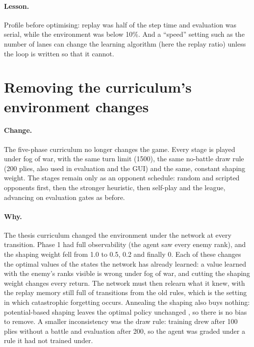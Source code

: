 \paragraph{Lesson.} Profile before optimising: replay was half of the step time and evaluation
was serial, while the environment was below 10\%. And a ``speed'' setting such as the number of
lanes can change the learning algorithm (here the replay ratio) unless the loop is written so
that it cannot.

\section{Removing the curriculum's environment changes}

\paragraph{Change.} The five-phase curriculum no longer changes the game. Every stage is played
under fog of war, with the same turn limit (1500), the same no-battle draw rule (200 plies,
also used in evaluation and the GUI) and the same, constant shaping weight. The stages remain
only as an opponent schedule: random and scripted opponents first, then the stronger heuristic,
then self-play and the league, advancing on evaluation gates as before.

\paragraph{Why.} The thesis curriculum \cite{CurriculumLearning} changed the environment under
the network at every transition. Phase 1 had full observability (the agent saw every enemy
rank), and the shaping weight fell from 1.0 to 0.5, 0.2 and finally 0. Each of these changes the
optimal values of the states the network has already learned: a value learned with the enemy's
ranks visible is wrong under fog of war, and cutting the shaping weight changes every return.
The network must then relearn what it knew, with the replay memory still full of transitions
from the old rules, which is the setting in which catastrophic forgetting
\cite{CatastrophicForgetting} occurs. Annealing the shaping also buys nothing: potential-based
shaping leaves the optimal policy unchanged \cite{NgPBRS}, so there is no bias to remove. A
smaller inconsistency was the draw rule: training drew after 100 plies without a battle and
evaluation after 200, so the agent was graded under a rule it had not trained under.

